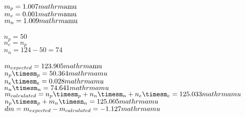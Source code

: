 \documentclass{article}
\begin{document}
$m_p=1.007\\mathrm{\mathrm{amu}}$\\
$m_e=0.001\\mathrm{\mathrm{amu}}$\\
$m_n=1.009\\mathrm{\mathrm{amu}}$\\
\\$n_p=50$\\
$n_e=n_p$\\
$n_n=124-50=74$\\
\\$m_{expected}=123.905\\mathrm{\mathrm{amu}}$\\
$n_p\timesm_p=50.364\\mathrm{amu}$\\
$n_e\timesm_e=0.028\\mathrm{amu}$\\
$n_n\timesm_n=74.641\\mathrm{amu}$\\
$m_{calculated}=n_p\timesm_p+n_n\timesm_n+n_e\timesm_e=125.033\\mathrm{amu}$\\
$n_p\timesm_p+m_n\timesn_n=125.005\\mathrm{amu}$\\
$dm=m_{expected}-m_{calculated}=-1.127\\mathrm{amu}$\\
\end{document}
